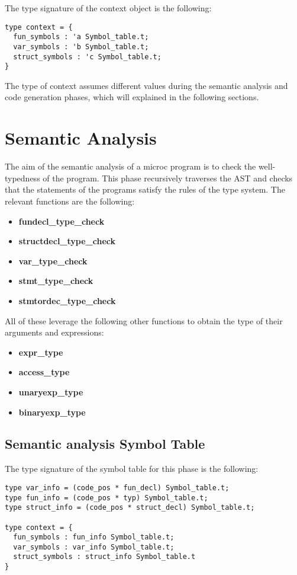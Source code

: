 \documentclass{article}
\begin{document}
The type signature of the context object is the following:
\begin{lstlisting}
type context = {
  fun_symbols : 'a Symbol_table.t;
  var_symbols : 'b Symbol_table.t;
  struct_symbols : 'c Symbol_table.t;
}
\end{lstlisting}

The type of context assumes different values during the semantic analysis and code generation phases, which will explained in the following sections.
\section{Semantic Analysis}
The aim of the semantic analysis of a microc program is to check the well-typedness of the program.
This phase recursively traverses the AST and checks that the statements of the programs satisfy the rules of the type system.
The relevant functions are the following:

\begin{itemize}
  \item \textbf{fundecl\_type\_check}
  \item \textbf{structdecl\_type\_check}
  \item \textbf{var\_type\_check}
  \item \textbf{stmt\_type\_check}
  \item \textbf{stmtordec\_type\_check}
\end{itemize}
All of these leverage the following other functions to obtain the type of their arguments and expressions:
\begin{itemize}
  \item \textbf{expr\_type}
  \item \textbf{access\_type}
  \item \textbf{unaryexp\_type}
  \item \textbf{binaryexp\_type}
\end{itemize}

\subsection{Semantic analysis Symbol Table}
The type signature of the symbol table for this phase is the following:

\begin{lstlisting}[basicstyle=\ttfamily\fontsize{6pt}{1em}]
type var_info = (code_pos * fun_decl) Symbol_table.t;
type fun_info = (code_pos * typ) Symbol_table.t;
type struct_info = (code_pos * struct_decl) Symbol_table.t;

type context = {
  fun_symbols : fun_info Symbol_table.t;
  var_symbols : var_info Symbol_table.t;
  struct_symbols : struct_info Symbol_table.t
}
\end{lstlisting}
\end{document}
